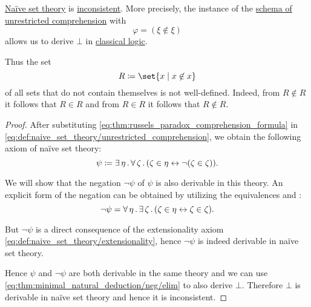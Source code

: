 \begin{theorem}\label{thm:russels_paradox}
  \hyperref[def:naive_set_theory]{Na\"ive set theory} is \hyperref[def:proof_derivation_system_consistency]{inconsistent}. More precisely, the instance of the \hyperref[def:naive_set_theory/unrestricted_comprehension]{schema of unrestricted comprehension} with
  \begin{equation}\label{eq:thm:russels_paradox_comprehension_formula}
    \varphi = (\xi \not\in \xi)
  \end{equation}
  allows us to derive \( \bot \) in \hyperref[def:classical_logic]{classical logic}.

  Thus the set
  \begin{equation}\label{eq:thm:russels_paradox_set}
    R \coloneqq \set{ x \given x \not\in x }
  \end{equation}
  of all sets that do not contain themselves is not well-defined. Indeed, from \( R \not\in R \) it follows that \( R \in R \) and from \( R \in R \) it follows that \( R \not\in R \).
\end{theorem}
\begin{proof}
  After substituting \eqref{eq:thm:russels_paradox_comprehension_formula} in \eqref{eq:def:naive_set_theory/unrestricted_comprehension}, we obtain the following axiom of na\"ive set theory:
  \begin{equation}\label{eq:thm:russels_paradox_comprehension_axiom}
    \psi \coloneqq \exists \thinspace \eta \thinspace . \thinspace \forall \thinspace \zeta \thinspace . \thinspace (\zeta \in \eta \leftrightarrow \neg (\zeta \in \zeta)).
  \end{equation}

  We will show that the negation \( \neg\psi \) of \( \psi \) is also derivable in this theory. An explicit form of the negation can be obtained by utilizing the equivalences  and :
  \begin{equation*}
    \neg\psi = \forall \thinspace \eta \thinspace . \thinspace \exists \thinspace \zeta \thinspace . \thinspace (\zeta \in \eta \leftrightarrow \zeta \in \zeta).
  \end{equation*}

  But \( \neg\psi \) is a direct consequence of the extensionality axiom \eqref{eq:def:naive_set_theory/extensionality}, hence \( \neg\psi \) is indeed derivable in na\"ive set theory.

  Hence \( \psi \) and \( \neg\psi \) are both derivable in the same theory and we can use \eqref{eq:thm:minimal_natural_deduction/neg/elim} to also derive \( \bot \). Therefore \( \bot \) is derivable in na\"ive set theory and hence it is inconsistent.
\end{proof}

